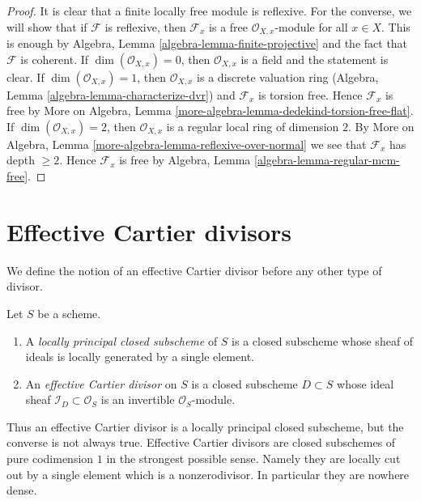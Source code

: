 \begin{proof}
It is clear that a finite locally free module is reflexive.
For the converse, we will show that if $\mathcal{F}$ is
reflexive, then $\mathcal{F}_x$ is a free $\mathcal{O}_{X, x}$-module
for all $x \in X$. This is enough by
Algebra, Lemma \ref{algebra-lemma-finite-projective}
and the fact that $\mathcal{F}$ is coherent.
If $\dim(\mathcal{O}_{X, x}) = 0$, then
$\mathcal{O}_{X, x}$ is a field and the statement is clear.
If $\dim(\mathcal{O}_{X, x}) = 1$, then $\mathcal{O}_{X, x}$
is a discrete valuation ring
(Algebra, Lemma \ref{algebra-lemma-characterize-dvr})
and $\mathcal{F}_x$ is torsion free.
Hence $\mathcal{F}_x$ is free by More on Algebra, Lemma
\ref{more-algebra-lemma-dedekind-torsion-free-flat}.
If $\dim(\mathcal{O}_{X, x}) = 2$, then $\mathcal{O}_{X, x}$
is a regular local ring of dimension $2$. By
More on Algebra, Lemma \ref{more-algebra-lemma-reflexive-over-normal}
we see that $\mathcal{F}_x$ has depth $\geq 2$.
Hence $\mathcal{F}_x$ is free by
Algebra, Lemma \ref{algebra-lemma-regular-mcm-free}.
\end{proof}







\section{Effective Cartier divisors}
\label{section-effective-Cartier-divisors}

\noindent
We define the notion of an effective Cartier divisor before any other type
of divisor.

\begin{definition}
\label{definition-effective-Cartier-divisor}
Let $S$ be a scheme.
\begin{enumerate}
\item A {\it locally principal closed subscheme} of $S$ is a closed subscheme
whose sheaf of ideals is locally generated by a single element.
\item An {\it effective Cartier divisor} on $S$ is a closed subscheme
$D \subset S$ whose ideal sheaf $\mathcal{I}_D \subset \mathcal{O}_S$
is an invertible $\mathcal{O}_S$-module.
\end{enumerate}
\end{definition}

\noindent
Thus an effective Cartier divisor is a locally principal closed subscheme,
but the converse is not always true. Effective Cartier divisors are closed
subschemes of pure codimension $1$ in the strongest possible sense. Namely
they are locally cut out by a single element which is a nonzerodivisor.
In particular they are nowhere dense.

